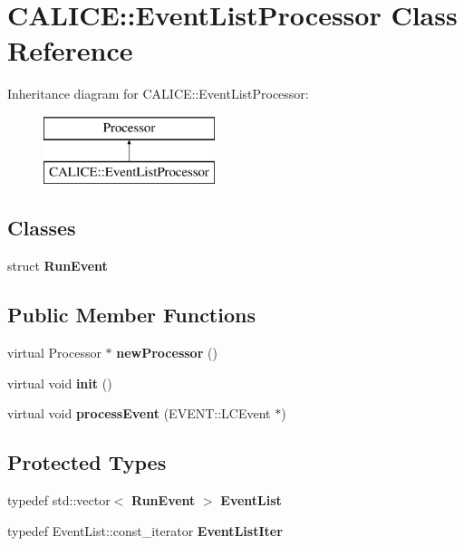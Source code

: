 \section{C\-A\-L\-I\-C\-E\-:\-:Event\-List\-Processor Class Reference}
\label{classCALICE_1_1EventListProcessor}
Inheritance diagram for C\-A\-L\-I\-C\-E\-:\-:Event\-List\-Processor\-:\begin{figure}[H]
\begin{center}
\leavevmode
\includegraphics[height=2.000000cm]{classCALICE_1_1EventListProcessor}
\end{center}
\end{figure}
\subsection*{Classes}
\begin{DoxyCompactItemize}
\item 
struct {\bf Run\-Event}
\end{DoxyCompactItemize}
\subsection*{Public Member Functions}
\begin{DoxyCompactItemize}
\item 
virtual Processor $\ast$ {\bfseries new\-Processor} ()\label{classCALICE_1_1EventListProcessor_a23be03857951c989b63af81d518564e9}

\item 
virtual void {\bfseries init} ()\label{classCALICE_1_1EventListProcessor_aa963b574bae85f4290f8ee22572ada31}

\item 
virtual void {\bfseries process\-Event} (E\-V\-E\-N\-T\-::\-L\-C\-Event $\ast$)\label{classCALICE_1_1EventListProcessor_a18ed652b62d32832397bc5c7a8fd698b}

\end{DoxyCompactItemize}
\subsection*{Protected Types}
\begin{DoxyCompactItemize}
\item 
typedef std\-::vector$<$ {\bf Run\-Event} $>$ {\bfseries Event\-List}\label{classCALICE_1_1EventListProcessor_a6900af21cf795245d9e295277dba761c}

\item 
typedef Event\-List\-::const\-\_\-iterator {\bfseries Event\-List\-Iter}\label{classCALICE_1_1EventListProcessor_a1016f6cc849ec0898035ca82bae77876}

\end{DoxyCompactItemize}
